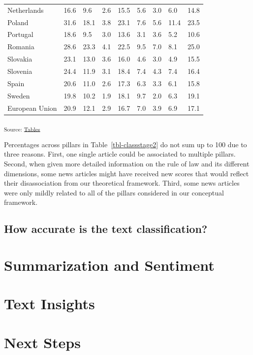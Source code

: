 \documentclass[
]{agujournal2019}
\begin{document}
\begin{longtable}[]{@{}lllllllll@{}}
Netherlands & 16.6 & 9.6 & 2.6 & 15.5 & 5.6 & 3.0 & 6.0 & 14.8 \\
Poland & 31.6 & 18.1 & 3.8 & 23.1 & 7.6 & 5.6 & 11.4 & 23.5 \\
Portugal & 18.6 & 9.5 & 3.0 & 13.6 & 3.1 & 3.6 & 5.2 & 10.6 \\
Romania & 28.6 & 23.3 & 4.1 & 22.5 & 9.5 & 7.0 & 8.1 & 25.0 \\
Slovakia & 23.1 & 13.0 & 3.6 & 16.0 & 4.6 & 3.0 & 4.9 & 15.5 \\
Slovenia & 24.4 & 11.9 & 3.1 & 18.4 & 7.4 & 4.3 & 7.4 & 16.4 \\
Spain & 20.6 & 11.0 & 2.6 & 17.3 & 6.3 & 3.3 & 6.1 & 15.8 \\
Sweden & 19.8 & 10.2 & 1.9 & 18.1 & 9.7 & 2.0 & 6.3 & 19.1 \\
European Union & 20.9 & 12.1 & 2.9 & 16.7 & 7.0 & 3.9 & 6.9 & 17.1 \\

\end{longtable}

\textsubscript{Source:
\href{https://ctoruno.github.io/eu-rol-tracker/notebooks/tables-preview.html\#cell-tbl-classstage2}{Tables}}

Percentages across pillars in Table~\ref{tbl-classstage2} do not sum up
to 100 due to three reasons. First, one single article could be
associated to multiple pillars. Second, when given more detailed
information on the rule of law and its different dimensions, some news
articles might have received new scores that would reflect their
disassociation from our theoretical framework. Third, some news articles
were only mildly related to all of the pillars considered in our
conceptual framework.

\subsection{How accurate is the text
classification?}\label{sec-accuracy}

\section{Summarization and Sentiment}\label{summarization-and-sentiment}

\section{Text Insights}\label{text-insights}

\section{Next Steps}\label{next-steps}
\end{document}
